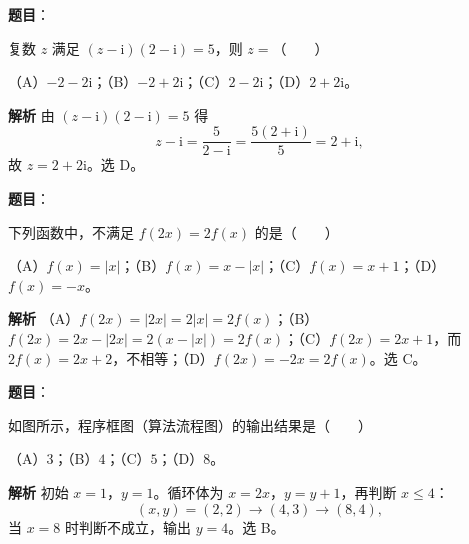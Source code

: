
\begin{answer}

\textbf{题目}：

复数 $z$ 满足 $(z-\mathrm i)(2-\mathrm i)=5$，则 $z=$\mbox{（　　）}

（A）$-2-2\mathrm i$；（B）$-2+2\mathrm i$；（C）$2-2\mathrm i$；（D）$2+2\mathrm i$。

\textbf{解析}
由 $(z-\mathrm i)(2-\mathrm i)=5$ 得
\nopagebreak[4]
\[z-\mathrm i=\frac5{2-\mathrm i}=\frac{5(2+\mathrm i)}5=2+\mathrm i,\]
故 $z=2+2\mathrm i$。选 D。


\end{answer}
\begin{answer}

\textbf{题目}：

下列函数中，不满足 $f(2x)=2f(x)$ 的是\mbox{（　　）}

（A）$f(x)=|x|$；（B）$f(x)=x-|x|$；（C）$f(x)=x+1$；（D）$f(x)=-x$。

\textbf{解析}
（A）$f(2x)=|2x|=2|x|=2f(x)$；（B）$f(2x)=2x-|2x|=2(x-|x|)=2f(x)$；（C）$f(2x)=2x+1$，而 $2f(x)=2x+2$，不相等；（D）$f(2x)=-2x=2f(x)$。选 C。


\end{answer}
\begin{answer}

\textbf{题目}：

如图所示，程序框图（算法流程图）的输出结果是\mbox{（　　）}
\nopagebreak[4]
\begin{center}\end{center}
\nopagebreak[4]
（A）$3$；（B）$4$；（C）$5$；（D）$8$。

\textbf{解析}
初始 $x=1$，$y=1$。循环体为 $x=2x$，$y=y+1$，再判断 $x\leqslant4$：
\nopagebreak[4]
\[(x,y)=(2,2)\to(4,3)\to(8,4),\]
当 $x=8$ 时判断不成立，输出 $y=4$。选 B。


\end{answer}
